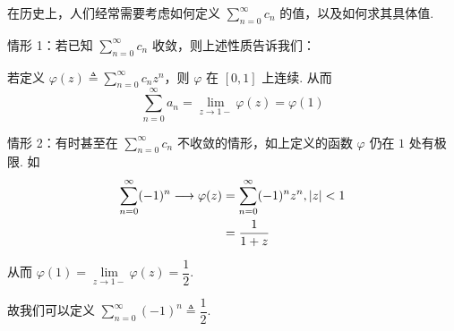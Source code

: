 \begin{example}[ Abel 求和]
    在历史上，人们经常需要考虑如何定义 $\sum\limits_{n=0}^\infty c_n$ 的值，以及如何求其具体值.

    情形 1：若已知 $\sum\limits_{n=0}^\infty c_n$ 收敛，则上述性质告诉我们：

    若定义 $\varphi(z)\triangleq\sum\limits_{n=0}^\infty c_nz^n$，则 $\varphi$ 在 $[0,1]$ 上连续. 从而
$$
\sum_{n=0}^\infty a_n=\lim_{z\to 1-}\varphi(z)=\varphi(1)
$$

    情形 2：有时甚至在 $\sum\limits_{n=0}^\infty c_n$ 不收敛的情形，如上定义的函数 $\varphi$ 仍在 $1$ 处有极限. 如
$$
\begin{aligned}
    \sum_{n=0}^\infty (-1)^n\longrightarrow \varphi(z)&=\sum_{n=0}^\infty (-1)^nz^n,\left\lvert{z}\right\rvert<1\\
    &=\frac{1}{1+z}
\end{aligned}
$$

    从而 $\varphi(1)=\lim\limits_{z\to 1-}\varphi(z)=\dfrac{1}{2}$.

    故我们可以定义 $\sum\limits_{n=0}^\infty(-1)^n\triangleq\dfrac{1}{2}$.
\end{example}